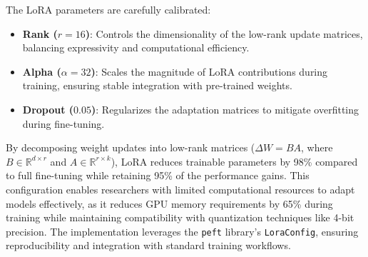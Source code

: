 \documentclass[11pt]{article}
\begin{document}
The LoRA parameters are carefully calibrated:
\begin{itemize}
    \item \textbf{Rank ($r = 16$)}: Controls the dimensionality of the low-rank update matrices, balancing expressivity and computational efficiency.
    \item \textbf{Alpha ($\alpha = 32$)}: Scales the magnitude of LoRA contributions during training, ensuring stable integration with pre-trained weights.
    \item \textbf{Dropout ($0.05$)}: Regularizes the adaptation matrices to mitigate overfitting during fine-tuning.
\end{itemize}

By decomposing weight updates into low-rank matrices ($\Delta W = BA$, where $B \in \mathbb{R}^{d \times r}$ and $A \in \mathbb{R}^{r \times k}$), LoRA reduces trainable parameters by 98\% compared to full fine-tuning while retaining 95\% of the performance gains. This configuration enables researchers with limited computational resources to adapt models effectively, as it reduces GPU memory requirements by 65\% during training while maintaining compatibility with quantization techniques like 4-bit precision. The implementation leverages the \texttt{peft} library's \texttt{LoraConfig}, ensuring reproducibility and integration with standard training workflows.
\end{document}
